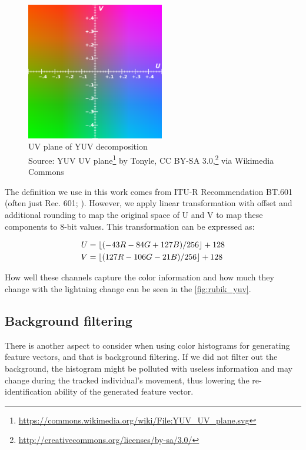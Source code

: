 \begin{figure}
    \centering
    \includegraphics[width=6cm]{img/YUV_UV_plane.svg.png}
    \caption[UV plane of YUV decomposition]{UV plane of YUV decomposition\\
    Source: YUV UV plane\footnote{\url{https://commons.wikimedia.org/wiki/File:YUV_UV_plane.svg}} by Tonyle, CC BY-SA 3.0,\footnote{\url{http://creativecommons.org/licenses/by-sa/3.0/}} via Wikimedia Commons}
    \label{fig:yuv_decomposition}
\end{figure}

The definition we use in this work comes from ITU-R Recommendation BT.601
(often just Rec. 601; \cite{bt2011studio}). However, we apply linear
transformation with offset and additional rounding to map the original space of U and V
to map these components to 8-bit values. This transformation can be expressed
as:

\begin{align*}
U &= \lfloor(-43R - 84G + 127B) / 256\rfloor + 128 \\
V &= \lfloor(127R - 106G - 21B) / 256\rfloor + 128
\end{align*}

How well these channels capture the color information and how much they change with the lightning change can be seen in the \autoref{fig:rubik_yuv}.

\subsection{Background filtering}

There is another aspect to consider when using color histograms for generating feature vectors, and that is background filtering. If we did not filter out the background, the histogram might be polluted with useless information and may change during the tracked individual's movement, thus lowering the re-identification ability of the generated feature vector.

